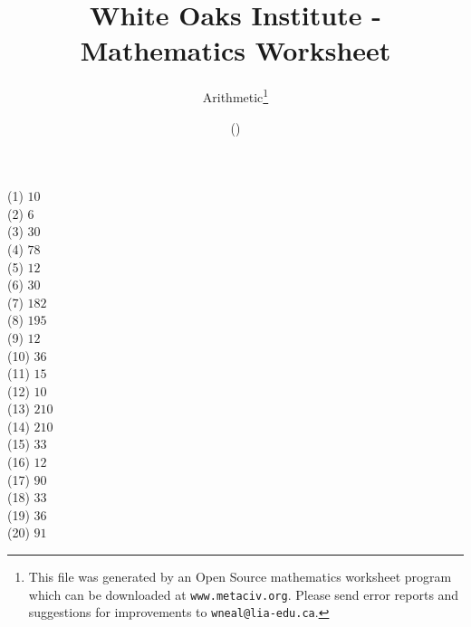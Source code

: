 \documentclass[letter]{article}
\begin{document}
\title{White Oaks Institute - Mathematics Worksheet}
\author{Arithmetic\thanks{This file was generated by an \textsf{Open Source} mathematics worksheet program which can be downloaded at \texttt{www.metaciv.org}. Please send error reports and suggestions for improvements to \texttt{wneal@lia-edu.ca}.}}
\date{\XCfileversion{} (\XCfiledate)}
\maketitle
\setlength{\parskip}{12mm plus 4mm minus 4mm}\setlength{\parindent}{0cm}\begin{multicols}{2}(1) $10$\\(2) $6$\\(3) $30$\\(4) $78$\\(5) $12$\\(6) $30$\\(7) $182$\\(8) $195$\\(9) $12$\\(10) $36$\\(11) $15$\\(12) $10$\\(13) $210$\\(14) $210$\\(15) $33$\\(16) $12$\\(17) $90$\\(18) $33$\\(19) $36$\\(20) $91$\\\end{multicols}
\end{document}
